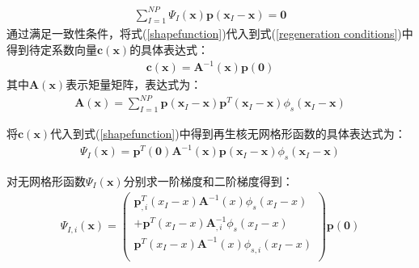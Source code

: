 \begin{equation}\label{regeneration conditions}
\begin{split}
    \sum_{I=1}^{N\!P}\Psi_I(\pmb{x})\pmb{p}(\pmb{x}_I-\pmb{x})=\pmb{0}
\end{split}
\end{equation}
通过满足一致性条件，将式(\ref{shapefunction})代入到式(\ref{regeneration conditions})中得到待定系数向量$\pmb{c}(\pmb{x})$的具体表达式：
\begin{equation}
\begin{split}
    \pmb{c}(\pmb{x})=\pmb{A}^{-1}(\pmb{x})\pmb{p}(\pmb{0})
\end{split}
\end{equation}
其中$\pmb{A}(\pmb{x})$表示矩量矩阵，表达式为：
\begin{equation}
\begin{split}
    \pmb{A}(\pmb{x})=\sum_{I=1}^{N\!P}\pmb{p}(\pmb{x}_I-\pmb{x})\pmb{p}^T(\pmb{x}_I-\pmb{x})\phi_s(\pmb{x}_I-\pmb{x})
\end{split}
\end{equation}\par
将$\pmb{c}(\pmb{x})$代入到式(\ref{shapefunction})中得到再生核无网格形函数的具体表达式为：
\begin{equation}\label{Pshapefunction}
\begin{split}
    \Psi_I(\pmb{x})=\pmb{p}^T(\pmb{0})\pmb{A}^{-1}(\pmb{x})\pmb{p}(\pmb{x}_I-\pmb{x})\phi_s(\pmb{x}_I-\pmb{x})
\end{split}
\end{equation}\par
对无网格形函数$\Psi_I(\pmb{x})$分别求一阶梯度和二阶梯度得到：
\begin{equation}
\begin{split}
    \Psi_{I,i}(\pmb{x})=\left(\begin{matrix}
    \pmb p_{,i}^{T}(x_I-x)\pmb A^{-1}(x)\phi_s(x_I-x)\\
    +\pmb p^{T}(x_I-x)\pmb A_{,i}^{-1}\phi_s(x_I-x)\\
    \pmb p^{T}(x_I-x)\pmb A^{-1}(x)\phi _{s,i}(x_I-x)\\
    \end{matrix}\right)
    \pmb p(\pmb 0)
\end{split}
\end{equation}
